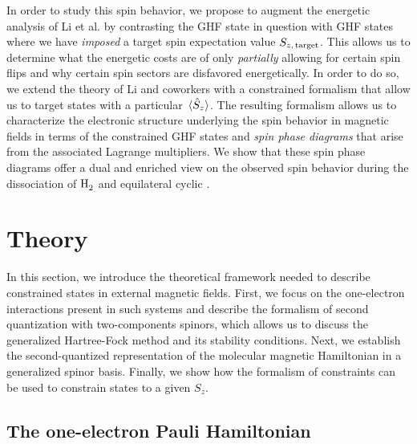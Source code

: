\documentclass[journal=jctc,manuscript=article]{achemso}
\begin{document}
    In order to study this spin behavior, we propose to augment the energetic analysis of Li et al. by contrasting the GHF state in question with GHF states where we have \emph{imposed} a target spin expectation value $S_{z, \thinspace \text{target}}$. 
    This allows us to determine what the energetic costs are of only \emph{partially} allowing for certain spin flips and why certain spin sectors are disfavored energetically.
    In order to do so, we extend the theory of Li and coworkers \cite{Sun.2019} with a constrained formalism \cite{Mukherji.1963, Zeiss.1983, Zeiss.1983a, Kaduk.2012, DeVriendt.2021} that allow us to target states with a particular $\ev*{\hat{S}_z}$.
    The resulting formalism allows us to characterize the electronic structure underlying the spin behavior in magnetic fields in terms of the constrained GHF states and \emph{spin phase diagrams} that arise from the associated Lagrange multipliers.
    We show that these spin phase diagrams offer a dual and enriched view on the observed spin behavior during the dissociation of $\ce{H2}$ and equilateral cyclic .

\section{Theory}

    In this section, we introduce the theoretical framework needed to describe constrained states in external magnetic fields. 
    First, we focus on the one-electron interactions present in such systems and describe the formalism of second quantization with two-components spinors, which allows us to discuss the generalized Hartree-Fock method and its stability conditions. 
    Next, we establish the second-quantized representation of the molecular magnetic Hamiltonian in a generalized spinor basis.
    Finally, we show how the formalism of constraints can be used to constrain states to a given $S_z$.

    \subsection{The one-electron Pauli Hamiltonian} \label{sec:theory:Pauli-Hamiltonian}
\end{document}
